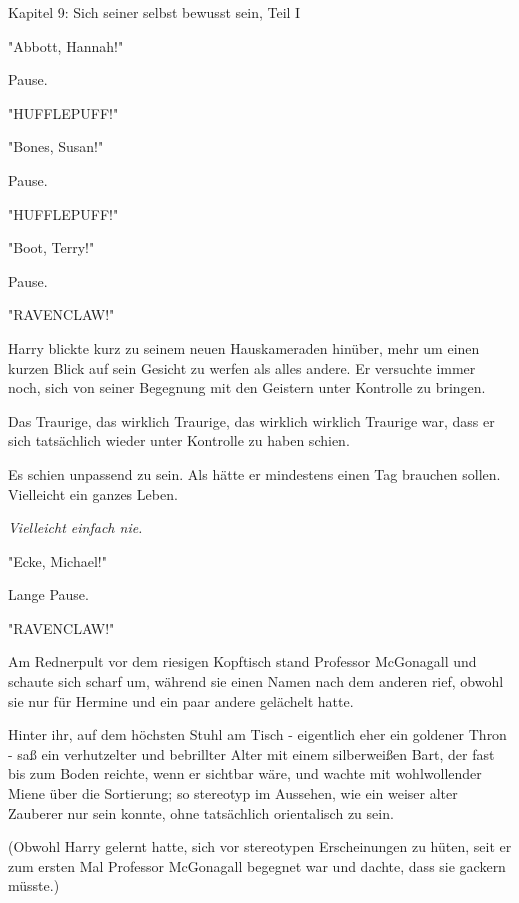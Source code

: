 

\hypertarget{sich-seiner-selbst-bewusst-sein-teil-1}{%

Kapitel 9: Sich seiner selbst bewusst sein, Teil I

"Abbott, Hannah!"

Pause.

"HUFFLEPUFF!"

"Bones, Susan!"

Pause.

"HUFFLEPUFF!"

"Boot, Terry!"

Pause.

"RAVENCLAW!"

Harry blickte kurz zu seinem neuen Hauskameraden hinüber, mehr um einen kurzen Blick auf sein Gesicht zu werfen als alles andere. Er versuchte immer noch, sich von seiner Begegnung mit den Geistern unter Kontrolle zu bringen.

Das Traurige, das wirklich Traurige, das wirklich wirklich Traurige war, dass er sich tatsächlich wieder unter Kontrolle zu haben schien.

Es schien unpassend zu sein. Als hätte er mindestens einen Tag brauchen sollen. Vielleicht ein ganzes Leben.

\emph{Vielleicht einfach nie.}

"Ecke, Michael!"

Lange Pause.

"RAVENCLAW!"

Am Rednerpult vor dem riesigen Kopftisch stand Professor McGonagall und schaute sich scharf um, während sie einen Namen nach dem anderen rief, obwohl sie nur für Hermine und ein paar andere gelächelt hatte.

Hinter ihr, auf dem höchsten Stuhl am Tisch - eigentlich eher ein goldener Thron - saß ein verhutzelter und bebrillter Alter mit einem silberweißen Bart, der fast bis zum Boden reichte, wenn er sichtbar wäre, und wachte mit wohlwollender Miene über die Sortierung; so stereotyp im Aussehen, wie ein weiser alter Zauberer nur sein konnte, ohne tatsächlich orientalisch zu sein.

(Obwohl Harry gelernt hatte, sich vor stereotypen Erscheinungen zu hüten, seit er zum ersten Mal Professor McGonagall begegnet war und dachte, dass sie gackern müsste.)

}
